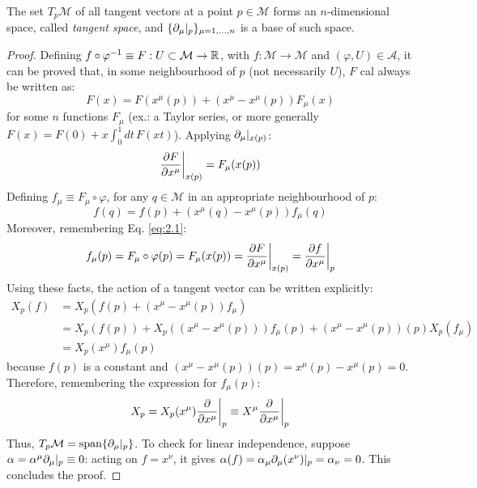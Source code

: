 \begin{theorem}
  The set $ T_p\mathcal{M} $ of all tangent vectors at a point $ p\in\mathcal{M} $ forms an $ n $-dimensional space, called \textit{tangent space}, and $ \{\partial_{\mu}\vert_p\}_{\mu = 1,\dots,n} $ is a base of such space.
\end{theorem}
\begin{proof}
  Defining $ f \circ \varphi^{-1} \equiv F : U \subset \mathcal{M} \rightarrow \mathbb{R} $, with $ f : \mathcal{M} \rightarrow \mathcal{M} $ and $ (\varphi,U) \in \mathcal{A} $, it can be proved that, in some neighbourhood of $ p $ (not necessarily $ U $), $ F $ cal always be written as:
  \begin{equation*}
    F(x) = F(x^{\mu}(p)) + \left( x^{\mu} - x^{\mu}(p) \right) F_{\mu}(x)
  \end{equation*}
  for some $ n $ functions $ F_{\mu} $ (ex.: a Taylor series, or more generally $ F(x) = F(0) + x \int_0^1 dt\,F(xt) $). Applying $ \partial_{\mu}\vert_{x(p)} $:
  \begin{equation*}
    \frac{\partial F}{\partial x^{\mu}}\bigg\vert_{x(p)} = F_{\mu}(x(p))
  \end{equation*}
  Defining $ f_{\mu} \equiv F_{\mu} \circ \varphi $, for any $ q \in \mathcal{M} $ in an appropriate neighbourhood of $ p $:
  \begin{equation*}
    f(q) = f(p) + \left( x^{\mu}(q) - x^{\mu}(p) \right) f_{\mu}(q)
  \end{equation*}
  Moreover, remembering Eq. \ref{eq:2.1}:
  \begin{equation*}
    f_{\mu}(p) = F_{\mu} \circ \varphi(p) = F_{\mu}(x(p)) = \frac{\partial F}{\partial x^{\mu}}\bigg\vert_{x(p)} = \frac{\partial f}{\partial x^{\mu}}\bigg\vert_p
  \end{equation*}
  Using these facts, the action of a tangent vector can be written explicitly:
  \begin{equation*}
    \begin{split}
      X_p(f)
      &= X_p\left( f(p) + \left( x^{\mu} - x^{\mu}(p) \right) f_{\mu} \right)\\
      &= X_p\left( f(p) \right) + X_p\left( \left( x^{\mu} - x^{\mu}(p) \right) \right) f_{\mu}(p) + \left( x^{\mu} - x^{\mu}(p) \right)(p) X_p\left( f_{\mu} \right)\\
      &= X_p\left( x^{\mu} \right) f_{\mu}(p)
    \end{split}
  \end{equation*}
  because $ f(p) $ is a constant and $ \left( x^{\mu} - x^{\mu}(p) \right)(p) = x^{\mu}(p) - x^{\mu}(p) = 0 $. Therefore, remembering the expression for $ f_{\mu}(p) $:
  \begin{equation*}
    X_p = X_p(x^{\mu}) \frac{\partial}{\partial x^{\mu}}\bigg\vert_p \equiv X^{\mu} \frac{\partial}{\partial x^{\mu}}\bigg\vert_p
  \end{equation*}
  Thus, $ T_p\mathcal{M} = \operatorname{span}\{\partial_{\mu}\vert_p\} $. To check for linear independence, suppose $ \alpha = \alpha^{\mu} \partial_{\mu}\vert_p \equiv 0 $: acting on $ f = x^{\nu} $, it gives $ \alpha(f) = \alpha_{\mu} \partial_{\mu}(x^{\nu})\vert_p = \alpha_{\nu} = 0 $. This concludes the proof.
\end{proof}

